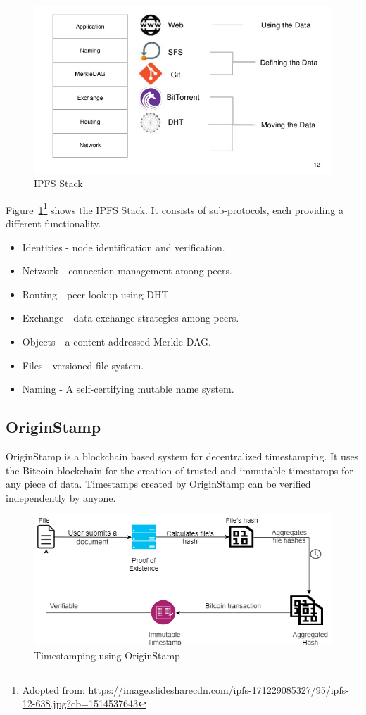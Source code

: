 \begin{figure}[h]
	\includegraphics[width=\linewidth]{figures/ipfs-stack}
	\caption{\label{fig:ipfs-stack} IPFS Stack}
\end{figure}

Figure~\ref{fig:ipfs-stack}\footnote{Adopted from: \url{https://image.slidesharecdn.com/ipfs-171229085327/95/ipfs-12-638.jpg?cb=1514537643}} shows the IPFS Stack. It consists of sub-protocols, each providing a different functionality.

\begin{itemize}
	\item Identities - node identification and verification.
	\item Network - connection management among peers.
	\item Routing - peer lookup using DHT.
	\item Exchange - data exchange strategies among peers.
	\item Objects - a content-addressed Merkle DAG.
	\item Files - versioned file system.
	\item Naming - A self-certifying mutable name system.
\end{itemize}

\subsection{OriginStamp}
OriginStamp\cite{hepp2018originstamp} is a blockchain based system for decentralized timestamping. It uses the Bitcoin blockchain for the creation of trusted and immutable timestamps for any piece of data. Timestamps created by OriginStamp can be verified independently by anyone.

\begin{figure}[h]
	\includegraphics[width=\linewidth]{figures/origin-stamp}
	\caption{\label{fig:originstamp} Timestamping using OriginStamp}
\end{figure}

